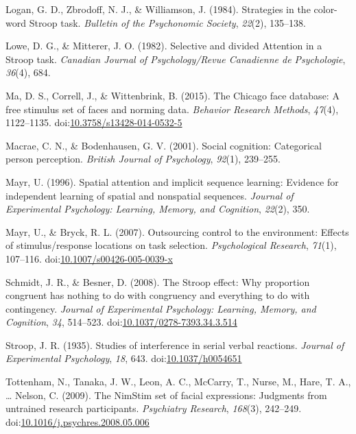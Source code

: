 \documentclass[english,,man,floatsintext]{apa6}
\begin{document}
\leavevmode\hypertarget{ref-logan_strategies_1984}{}%
Logan, G. D., Zbrodoff, N. J., \& Williamson, J. (1984). Strategies in the color-word Stroop task. \emph{Bulletin of the Psychonomic Society}, \emph{22}(2), 135--138.

\leavevmode\hypertarget{ref-lowe_selective_1982}{}%
Lowe, D. G., \& Mitterer, J. O. (1982). Selective and divided Attention in a Stroop task. \emph{Canadian Journal of Psychology/Revue Canadienne de Psychologie}, \emph{36}(4), 684.

\leavevmode\hypertarget{ref-ma_chicago_2015}{}%
Ma, D. S., Correll, J., \& Wittenbrink, B. (2015). The Chicago face database: A free stimulus set of faces and norming data. \emph{Behavior Research Methods}, \emph{47}(4), 1122--1135. doi:\href{https://doi.org/10.3758/s13428-014-0532-5}{10.3758/s13428-014-0532-5}

\leavevmode\hypertarget{ref-macrae_social_2001}{}%
Macrae, C. N., \& Bodenhausen, G. V. (2001). Social cognition: Categorical person perception. \emph{British Journal of Psychology}, \emph{92}(1), 239--255.

\leavevmode\hypertarget{ref-mayr_spatial_1996}{}%
Mayr, U. (1996). Spatial attention and implicit sequence learning: Evidence for independent learning of spatial and nonspatial sequences. \emph{Journal of Experimental Psychology: Learning, Memory, and Cognition}, \emph{22}(2), 350.

\leavevmode\hypertarget{ref-mayr_outsourcing_2007}{}%
Mayr, U., \& Bryck, R. L. (2007). Outsourcing control to the environment: Effects of stimulus/response locations on task selection. \emph{Psychological Research}, \emph{71}(1), 107--116. doi:\href{https://doi.org/10.1007/s00426-005-0039-x}{10.1007/s00426-005-0039-x}

\leavevmode\hypertarget{ref-schmidt_stroop_2008}{}%
Schmidt, J. R., \& Besner, D. (2008). The Stroop effect: Why proportion congruent has nothing to do with congruency and everything to do with contingency. \emph{Journal of Experimental Psychology: Learning, Memory, and Cognition}, \emph{34}, 514--523. doi:\href{https://doi.org/10.1037/0278-7393.34.3.514}{10.1037/0278-7393.34.3.514}

\leavevmode\hypertarget{ref-stroop_studies_1935}{}%
Stroop, J. R. (1935). Studies of interference in serial verbal reactions. \emph{Journal of Experimental Psychology}, \emph{18}, 643. doi:\href{https://doi.org/10.1037/h0054651}{10.1037/h0054651}

\leavevmode\hypertarget{ref-tottenham_nimstim_2009}{}%
Tottenham, N., Tanaka, J. W., Leon, A. C., McCarry, T., Nurse, M., Hare, T. A., \ldots{} Nelson, C. (2009). The NimStim set of facial expressions: Judgments from untrained research participants. \emph{Psychiatry Research}, \emph{168}(3), 242--249. doi:\href{https://doi.org/10.1016/j.psychres.2008.05.006}{10.1016/j.psychres.2008.05.006}
\end{document}

